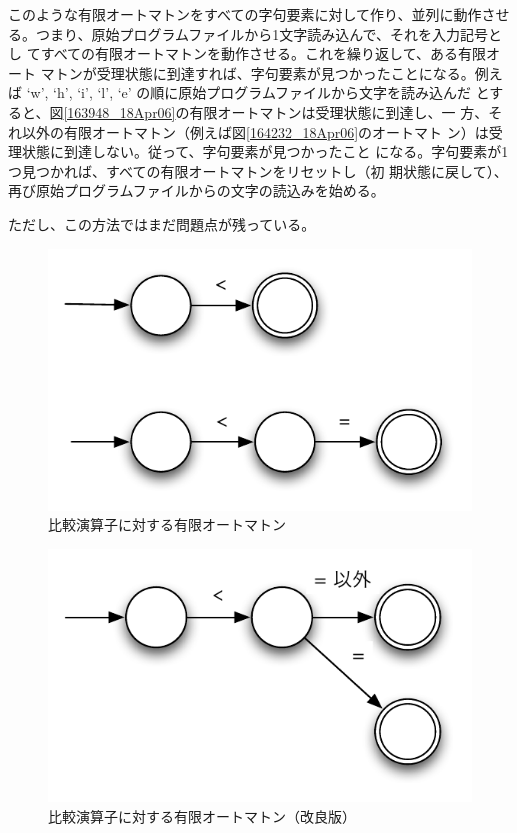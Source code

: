 このような有限オートマトンをすべての字句要素に対して作り、並列に動作させ
る。つまり、原始プログラムファイルから1文字読み込んで、それを入力記号とし
てすべての有限オートマトンを動作させる。これを繰り返して、ある有限オート
マトンが受理状態に到達すれば、字句要素が見つかったことになる。例えば
`w', `h', `i', `l', `e' の順に原始プログラムファイルから文字を読み込んだ
とすると、図\ref{163948_18Apr06}の有限オートマトンは受理状態に到達し、一
方、それ以外の有限オートマトン（例えば図\ref{164232_18Apr06}のオートマト
ン）は受理状態に到達しない。従って、字句要素が見つかったこと
になる。字句要素が1つ見つかれば、すべての有限オートマトンをリセットし（初
期状態に戻して）、再び原始プログラムファイルからの文字の読込みを始める。

ただし、この方法ではまだ問題点が残っている。
\begin{figure}
 \begin{center}
  \includegraphics{figure/fa_relop.pdf}
 \end{center}
 \caption{比較演算子に対する有限オートマトン}
 \label{182549_18Apr06}
\end{figure}
\begin{figure}
 \begin{center}
  \includegraphics{figure/fa_relop_fixed.pdf}
 \end{center}
 \caption{比較演算子に対する有限オートマトン（改良版）}
 \label{183745_18Apr06}
\end{figure}

